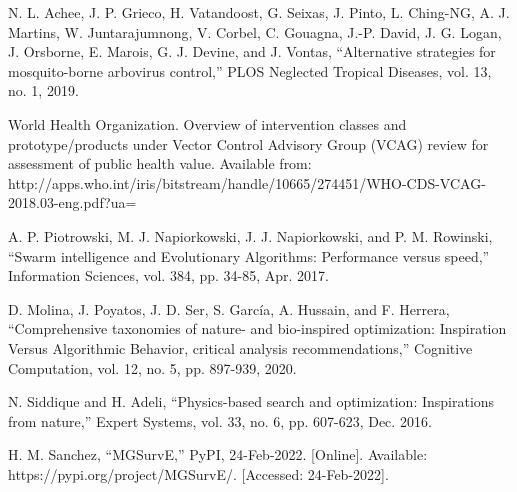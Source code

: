 \documentclass[letterpaper, 10pt, conference]{ieeeconf}
\begin{document}
\begin{thebibliography}{99}
  N. L. Achee, J. P. Grieco, H. Vatandoost, G. Seixas, J. Pinto, L. Ching-NG, A. J. Martins, W. Juntarajumnong, V. Corbel, C. Gouagna, J.-P. David, J. G. Logan, J. Orsborne, E. Marois, G. J. Devine, and J. Vontas, “Alternative strategies for mosquito-borne arbovirus control,” PLOS Neglected Tropical Diseases, vol. 13, no. 1, 2019. 
  
  World Health Organization. Overview of intervention classes and prototype/products under Vector Control Advisory Group (VCAG) review for assessment of public health value. Available from: http://apps.who.int/iris/bitstream/handle/10665/274451/WHO-CDS-VCAG-2018.03-eng.pdf?ua=

  A. P. Piotrowski, M. J. Napiorkowski, J. J. Napiorkowski, and P. M. Rowinski, “Swarm intelligence and Evolutionary Algorithms: Performance versus speed,” Information Sciences, vol. 384, pp. 34-85, Apr. 2017. 

  D. Molina, J. Poyatos, J. D. Ser, S. García, A. Hussain, and F. Herrera, “Comprehensive taxonomies of nature- and bio-inspired optimization: Inspiration Versus Algorithmic Behavior, critical analysis recommendations,” Cognitive Computation, vol. 12, no. 5, pp. 897-939, 2020. 

  N. Siddique and H. Adeli, “Physics-based search and optimization: Inspirations from nature,” Expert Systems, vol. 33, no. 6, pp. 607-623, Dec. 2016. 
  
  H. M. Sanchez, “MGSurvE,” PyPI, 24-Feb-2022. [Online]. Available: https://pypi.org/project/MGSurvE/. [Accessed: 24-Feb-2022]. 
\end{thebibliography}
\end{document}
